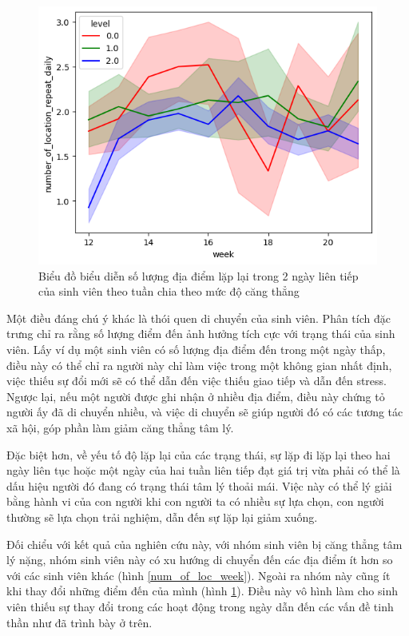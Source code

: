 \begin{figure}[!ht]
    \centering
    \includegraphics[width=0.75\linewidth]{num_of_location_daily_week.png}
    \caption{Biểu đồ biểu diễn số lượng địa điểm lặp lại trong 2 ngày liên tiếp của sinh viên theo tuần chia theo mức độ căng thẳng}
    \label{daily repeat}
\end{figure}

Một điều đáng chú ý khác là thói quen di chuyển của sinh viên. Phân tích đặc trưng chỉ ra rằng số lượng điểm đến ảnh hưởng tích cực với trạng thái của sinh viên. Lấy ví dụ một sinh viên có số lượng địa điểm đến trong một ngày thấp, điều này có thể chỉ ra người này chỉ làm việc trong một không gian nhất định, việc thiếu sự đổi mới sẽ có thể dẫn đến việc thiếu giao tiếp và dẫn đến stress. Ngược lại, nếu một người được ghi nhận ở nhiều địa điểm, điều này chứng tỏ người ấy đã di chuyển nhiều, và việc di chuyển sẽ giúp người đó có các tương tác xã hội, góp phần làm giảm căng thẳng tâm lý. 

Đặc biệt hơn, về yếu tố độ lặp lại của các trạng thái, sự lặp đi lặp lại theo hai ngày liên tục hoặc một ngày của hai tuần liên tiếp đạt giá trị vừa phải có thể là dấu hiệu người đó đang có trạng thái tâm lý thoải mái. Việc này có thể lý giải bằng hành vi của con người khi con người ta có nhiều sự lựa chọn, con người thường sẽ lựa chọn trải nghiệm, dẫn đến sự lặp lại giảm xuống. 

Đối chiểu với kết quả của nghiên cứu này, với nhóm sinh viên bị căng thẳng tâm lý nặng, nhóm sinh viên này có xu hướng di chuyển đến các địa điểm ít hơn so với các sinh viên khác (hình \ref{num_of_loc_week}). Ngoài ra nhóm này cũng ít khi thay đổi những điểm đến của mình (hình \ref{daily repeat}). Điều này vô hình làm cho sinh viên thiếu sự thay đổi trong các hoạt động trong ngày dẫn đến các vấn đề tinh thần như đã trình bày ở trên.


